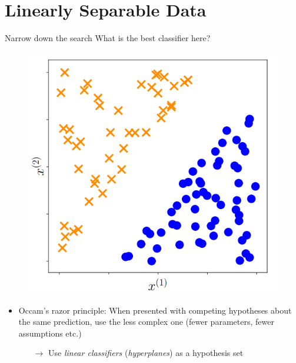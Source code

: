 \documentclass[dvipsnames]{beamer}
\begin{document}
		\section{Linearly Separable Data}
		\begin{frame}{Narrow down the search}
			What is the best classifier here?
				\begin{figure}
					\center
					\includegraphics[scale=.3]{figures/binary.png}
        \end{figure}
			\begin{itemize}	
				\item Occam's razor principle: When presented with competing hypotheses about the same prediction, use the less complex one (fewer parameters, fewer assumptions etc.)
				\begin{itemize}
					\item[$\rightarrow$] Use \emph{linear classifiers} (\emph{hyperplanes}) as a hypothesis set 
				\end{itemize}
			\end{itemize}
    \end{frame}
		
\end{document}
